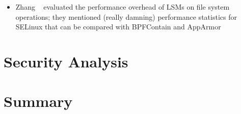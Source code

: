 \begin{inprogress}
  \begin{itemize}
    \item Zhang \etal~\cite{zhang2021_lsm_file_overhead} evaluated the performance
    overhead of LSMs on file system operations; they mentioned (really damning) performance
    statistics for SELinux that can be compared with BPFContain and AppArmor
  \end{itemize}
\end{inprogress}

\section{Security Analysis}%
\label{s:eval-security}



\section{Summary}%
\label{s:eval-summary}
